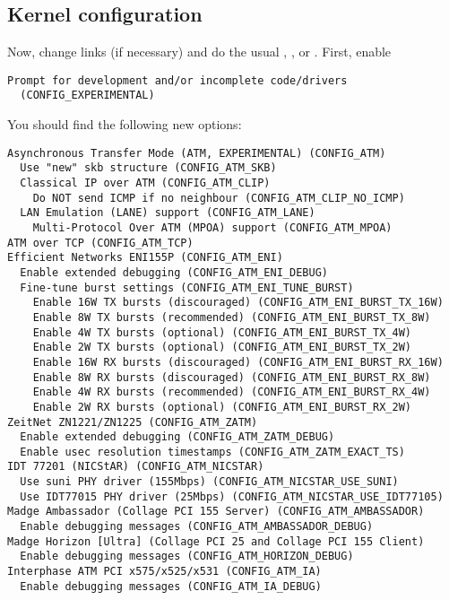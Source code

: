 \subsection{Kernel configuration}

Now, change links (if necessary) and do the usual ,
, or . First, enable
\begin{verbatim}
Prompt for development and/or incomplete code/drivers
  (CONFIG_EXPERIMENTAL)
\end{verbatim}

You should find the following new options:

\begin{verbatim}
Asynchronous Transfer Mode (ATM, EXPERIMENTAL) (CONFIG_ATM)
  Use "new" skb structure (CONFIG_ATM_SKB)
  Classical IP over ATM (CONFIG_ATM_CLIP)
    Do NOT send ICMP if no neighbour (CONFIG_ATM_CLIP_NO_ICMP)
  LAN Emulation (LANE) support (CONFIG_ATM_LANE)
    Multi-Protocol Over ATM (MPOA) support (CONFIG_ATM_MPOA)
ATM over TCP (CONFIG_ATM_TCP)
Efficient Networks ENI155P (CONFIG_ATM_ENI)
  Enable extended debugging (CONFIG_ATM_ENI_DEBUG)
  Fine-tune burst settings (CONFIG_ATM_ENI_TUNE_BURST)
    Enable 16W TX bursts (discouraged) (CONFIG_ATM_ENI_BURST_TX_16W)
    Enable 8W TX bursts (recommended) (CONFIG_ATM_ENI_BURST_TX_8W)
    Enable 4W TX bursts (optional) (CONFIG_ATM_ENI_BURST_TX_4W)
    Enable 2W TX bursts (optional) (CONFIG_ATM_ENI_BURST_TX_2W)
    Enable 16W RX bursts (discouraged) (CONFIG_ATM_ENI_BURST_RX_16W)
    Enable 8W RX bursts (discouraged) (CONFIG_ATM_ENI_BURST_RX_8W)
    Enable 4W RX bursts (recommended) (CONFIG_ATM_ENI_BURST_RX_4W)
    Enable 2W RX bursts (optional) (CONFIG_ATM_ENI_BURST_RX_2W)
ZeitNet ZN1221/ZN1225 (CONFIG_ATM_ZATM)
  Enable extended debugging (CONFIG_ATM_ZATM_DEBUG)
  Enable usec resolution timestamps (CONFIG_ATM_ZATM_EXACT_TS)
IDT 77201 (NICStAR) (CONFIG_ATM_NICSTAR)
  Use suni PHY driver (155Mbps) (CONFIG_ATM_NICSTAR_USE_SUNI)
  Use IDT77015 PHY driver (25Mbps) (CONFIG_ATM_NICSTAR_USE_IDT77105)
Madge Ambassador (Collage PCI 155 Server) (CONFIG_ATM_AMBASSADOR)
  Enable debugging messages (CONFIG_ATM_AMBASSADOR_DEBUG)
Madge Horizon [Ultra] (Collage PCI 25 and Collage PCI 155 Client)
  Enable debugging messages (CONFIG_ATM_HORIZON_DEBUG)
Interphase ATM PCI x575/x525/x531 (CONFIG_ATM_IA)
  Enable debugging messages (CONFIG_ATM_IA_DEBUG)
\end{verbatim}


